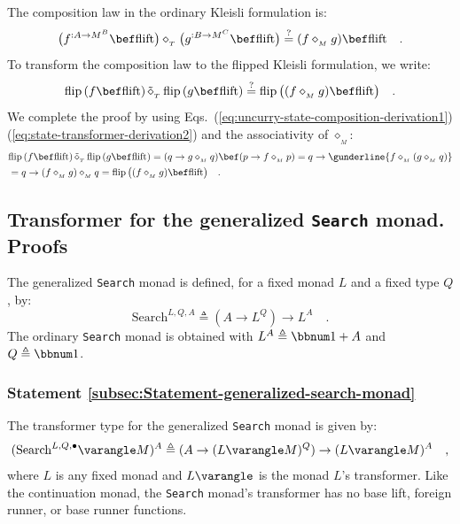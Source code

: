 The composition law in the ordinary Kleisli formulation is:
\[
\big(f^{:A\rightarrow M^{B}}\bef\text{flift}\big)\diamond_{_{T}}\big(g^{:B\rightarrow M^{C}}\bef\text{flift}\big)\overset{?}{=}(f\diamond_{_{M}}g)\bef\text{flift}\quad.
\]
To transform the composition law to the flipped Kleisli formulation,
we write:
\[
\text{flip}\,(f\bef\text{flift})\,\tilde{\diamond}_{_{T}}\,\text{flip}\,(g\bef\text{flift})\overset{?}{=}\text{flip}\,\big((f\diamond_{_{M}}g)\bef\text{flift}\big)\quad.
\]
We complete the proof by using Eqs.~(\ref{eq:uncurry-state-composition-derivation1})\textendash (\ref{eq:state-transformer-derivation2})
and the associativity of $\diamond_{_{M}}$:
\begin{align*}
 & \text{flip}\,(f\bef\text{flift})\,\tilde{\diamond}_{_{T}}\,\text{flip}\,(g\bef\text{flift})=(q\rightarrow g\diamond_{_{M}}q)\bef(p\rightarrow f\diamond_{_{M}}p)=q\rightarrow\gunderline{f\diamond_{_{M}}(g\diamond_{_{M}}q)}\\
 & =q\rightarrow(f\diamond_{_{M}}g)\diamond_{_{M}}q=\text{flip}\,\big((f\diamond_{_{M}}g)\bef\text{flift}\big)\quad.
\end{align*}


\subsection{Transformer for the generalized \texttt{Search} monad. Proofs\label{subsec:Transformer-for-the-generalized-search-monad}}

The generalized
\lstinline!Search! monad is defined, for a fixed monad $L$ and a
fixed type $Q$, by:
\[
\text{Search}^{L,Q,A}\triangleq(A\rightarrow L^{Q})\rightarrow L^{A}\quad.
\]
The ordinary \lstinline!Search! monad is obtained with $L^{A}\triangleq\bbnum 1+A$
and $Q\triangleq\bbnum 1$.

\subsubsection{Statement \label{subsec:Statement-generalized-search-monad}\ref{subsec:Statement-generalized-search-monad}}

The transformer type for the generalized \lstinline!Search! monad
is given by:
\[
(\text{Search}^{L,Q,\bullet}\varangle M)^{A}\triangleq(A\rightarrow(L\varangle M)^{Q})\rightarrow(L\varangle M)^{A}\quad,
\]
where $L$ is any fixed monad and $L\varangle$ is the monad $L$\textsf{'}s
transformer. Like the continuation monad, the \lstinline!Search!
monad\textsf{'}s transformer has no base lift, foreign runner, or base runner
functions.

